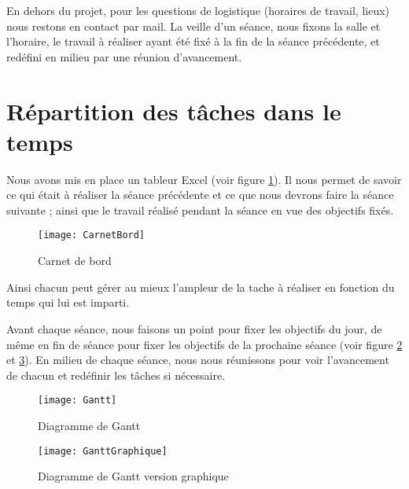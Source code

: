 En dehors du projet, pour les questions de logistique (horaires de travail, lieux) nous restons en contact par mail. La veille d'un séance, nous fixons la salle et l'horaire, le travail à réaliser ayant été fixé à la fin de la séance précédente, et redéfini en milieu par une réunion d'avancement.  

\section{Répartition des tâches dans le temps}

Nous avons mis en place un tableur Excel (voir figure \ref{fig:CarnetBord}). Il nous permet de savoir ce qui était à réaliser la séance précédente et ce que nous devrons faire la séance suivante ; ainsi que le travail réalisé pendant la séance en vue des objectifs fixés. 

\begin{figure}[h]
  \centering
  \texttt{[image: CarnetBord]}
  \caption{Carnet de bord}
  \label{fig:CarnetBord}
\end{figure}

Ainsi chacun peut gérer au mieux l'ampleur de la tache à réaliser en fonction du temps qui lui est imparti.
 
Avant chaque séance, nous faisons un point pour fixer les objectifs du jour, de même en fin de séance pour fixer les objectifs de la prochaine séance (voir figure \ref{fig:Gantt} et \ref{fig:GanttGraphique}). 
En milieu de chaque séance, nous nous réunissons pour voir l'avancement de chacun et redéfinir les tâches si nécessaire. 

\begin{figure}[h]
  \centering
  \texttt{[image: Gantt]}
  \caption{Diagramme de Gantt}
  \label{fig:Gantt}
\end{figure}

\begin{figure}[h]
  \centering
  \texttt{[image: GanttGraphique]}
  \caption{Diagramme de Gantt version graphique}
  \label{fig:GanttGraphique}
\end{figure}
